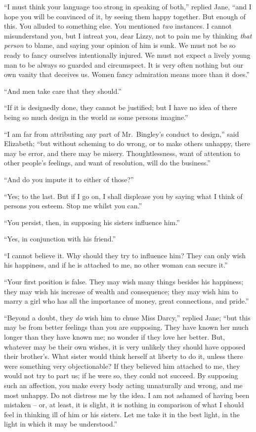 “I must think your language too strong in speaking
of both,” replied Jane, “and I hope you will be convinced
of it, by seeing them happy together. But enough of this.
You alluded to something else. You mentioned \textit{two}
instances. I cannot misunderstand you, but I intreat
you, dear Lizzy, not to pain me by thinking \textit{that person}
to blame, and saying your opinion of him is sunk. We
must not be so ready to fancy ourselves intentionally
injured. We must not expect a lively young man to be
always so guarded and circumspect. It is very often
nothing but our own vanity that deceives us. Women
fancy admiration means more than it does.”

“And men take care that they should.”

“If it is designedly done, they cannot be justified;
but I have no idea of there being so much design in the
world as some persons imagine.”

“I am far from attributing any part of Mr.\ Bingley’s
conduct to design,” said Elizabeth; “but without
scheming to do wrong, or to make others unhappy, there
may be error, and there may be misery. Thoughtlessness,
want of attention to other people’s feelings, and want of
resolution, will do the business.”

“And do you impute it to either of those?”

“Yes; to the last. But if I go on, I shall displease
you by saying what I think of persons you esteem. Stop
me whilst you can.”

“You persist, then, in supposing his sisters influence
him.”

“Yes, in conjunction with his friend.”

“I cannot believe it. Why should they try to influence
him? They can only wish his happiness, and if he is
attached to me, no other woman can secure it.”

“Your first position is false. They may wish many
things besides his happiness; they may wish his increase
of wealth and consequence; they may wish him to marry
a girl who has all the importance of money, great connections,
and pride.”

“Beyond a doubt, they \textit{do} wish him to chuse Miss
Darcy,” replied Jane; “but this may be from better
feelings than you are supposing. They have known her
much longer than they have known me; no wonder if they
love her better. But, whatever may be their own wishes,
it is very unlikely they should have opposed their brother’s.
What sister would think herself at liberty to do it, unless
there were something very objectionable? If they believed
him attached to me, they would not try to part us; if he
were so, they could not succeed. By supposing such an
affection, you make every body acting unnaturally and
wrong, and me most unhappy. Do not distress me by the
idea. I am not ashamed of having been mistaken -- or,
at least, it is slight, it is nothing in comparison of what
I should feel in thinking ill of him or his sisters. Let me
take it in the best light, in the light in which it may be
understood.”

